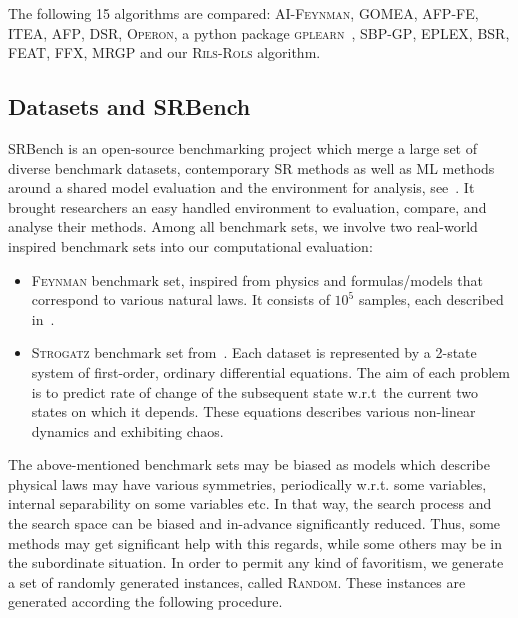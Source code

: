 \documentclass[a4paper,12pt]{elsarticle}
\begin{document}
The following 15 algorithms are compared: \textsc{AI-Feynman}, \textsc{GOMEA}, \textsc{AFP-FE}, \textsc{ITEA}, \textsc{AFP}, \textsc{DSR}, \textsc{Operon},  a python package \textsc{gplearn}~\cite{stephens2016genetic}, \textsc{SBP-GP}, \textsc{EPLEX}, \textsc{BSR}, \textsc{FEAT}, \textsc{FFX}, \textsc{MRGP} and our \textsc{Rils}-\textsc{Rols} algorithm.


 
\subsection{Datasets and SRBench}

SRBench is an open-source benchmarking project which merge a large set of diverse benchmark datasets, contemporary SR methods as well as ML methods around a shared model evaluation and the environment for analysis, see~\cite{la2021contemporary}. It brought researchers an easy handled environment to evaluation, compare, and analyse their methods. Among all benchmark sets, we involve two real-world inspired benchmark sets into our computational evaluation: 
\begin{itemize}
	\item \textsc{Feynman} benchmark set, inspired from physics and formulas/models that correspond to various natural laws.  
	It consists of $10^5$  samples, each described in~\cite{udrescu2020ai}. 
	\item \textsc{Strogatz} benchmark set from~\cite{la2016inference}. 
	Each dataset is represented by a 2-state system of first-order, ordinary differential equations. 
	The aim of each problem is to predict rate of change of the subsequent state w.r.t\  the current two states on which it depends. These equations describes various non-linear dynamics and exhibiting chaos.   

\end{itemize}
The above-mentioned benchmark sets may be biased as models which describe physical laws may have various symmetries, periodically w.r.t. some variables, internal separability on some variables etc. In that way, the search process and the search space can be biased and in-advance significantly reduced. Thus, some methods may get significant help with this regards, while some others may be in the subordinate situation. 
  In order to permit any kind of favoritism, we generate a set of randomly generated instances, called \textsc{Random}. These instances are generated according the following procedure. 
\end{document}
